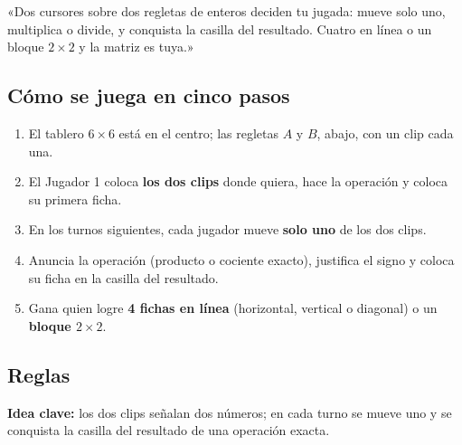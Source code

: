 \documentclass[12pt, letterpaper]{article}
\begin{document}
\begin{cuadroextra}
  «Dos cursores sobre dos regletas de enteros deciden tu jugada: mueve solo uno, multiplica o divide, y conquista la casilla del resultado. Cuatro en línea o un bloque $2\times 2$ y la matriz es tuya.»
\end{cuadroextra}

\subsection{Cómo se juega en cinco pasos}

\begin{enumerate}[leftmargin=*]
  \item El tablero $6\times 6$ está en el centro; las regletas $A$ y $B$, abajo, con un clip cada una.
  \item El Jugador 1 coloca \textbf{los dos clips} donde quiera, hace la operación y coloca su primera ficha.
  \item En los turnos siguientes, cada jugador mueve \textbf{solo uno} de los dos clips.
  \item Anuncia la operación (producto o cociente exacto), justifica el signo y coloca su ficha en la casilla del resultado.
  \item Gana quien logre \textbf{4 fichas en línea} (horizontal, vertical o diagonal) o un \textbf{bloque $2\times 2$}.
\end{enumerate}

\subsection{Reglas}

\textbf{Idea clave:} los dos clips señalan dos números; en cada turno se mueve uno y se conquista la casilla del resultado de una operación exacta.
\end{document}
